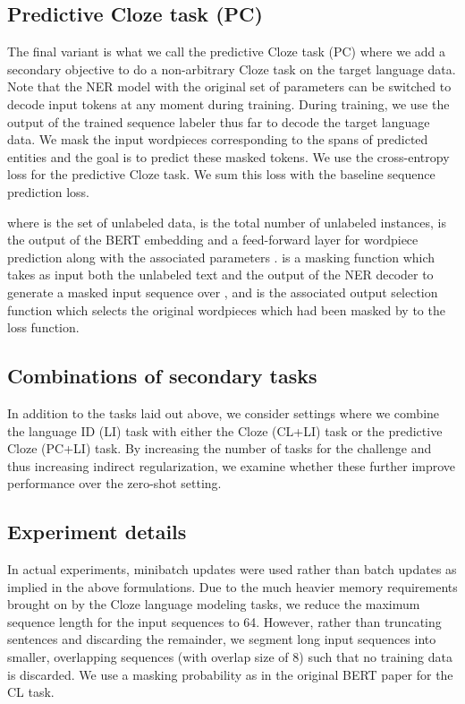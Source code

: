\documentclass[letterpaper]{article} \usepackage{aaai20}  \usepackage{times}  \usepackage{helvet} \usepackage{courier}  \usepackage[hyphens]{url}  \usepackage{graphicx} \urlstyle{rm} \def\UrlFont{\rm}  \usepackage{graphicx}  \frenchspacing  \setlength{\pdfpagewidth}{8.5in}  \setlength{\pdfpageheight}{11in}  \usepackage{amsmath}
\begin{document}
\subsection{Predictive Cloze task (PC)}

The final variant is what we call the predictive Cloze task (PC) where we add a secondary objective to do a non-arbitrary Cloze task on the
target language data. 
Note that the NER model  with the original set of parameters can be switched to decode input tokens at any moment during training. 
During training, we use the output of the
trained sequence labeler thus far to decode the target language
data. We mask the input wordpieces corresponding to the spans of predicted
entities and the goal is to predict these masked tokens. We use the
cross-entropy loss for the predictive Cloze task. We sum this loss
with the baseline sequence prediction loss.

where  is the set of unlabeled data,  is the total number of unlabeled instances,  is the output of the BERT embedding and a feed-forward layer for wordpiece prediction along with the associated parameters .  is a masking function which takes as input both the unlabeled text  and the output of the NER decoder  to generate a masked input sequence over , and  is the associated output selection function which selects the original wordpieces which had been masked by  to the loss function.

\subsection{Combinations of secondary tasks}
In addition to the tasks laid out above, we consider settings where we combine the language ID (LI) task with either the Cloze (CL+LI) task or the predictive Cloze (PC+LI) task. By increasing the number of tasks for the challenge and thus increasing indirect regularization, we examine whether these further improve performance over the zero-shot setting.

\subsection{Experiment details}

In actual experiments, minibatch updates were used rather than batch updates as implied in the above formulations.
Due to the much heavier memory requirements brought on by the Cloze language modeling tasks, we reduce the maximum sequence length for the input sequences to 64. However, rather than truncating sentences and discarding the remainder, we segment long input sequences into smaller, overlapping sequences (with overlap size of 8) such that no training data is discarded. We use a masking probability  as in the original BERT paper for the CL task.
\end{document}
